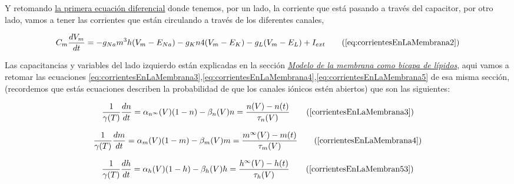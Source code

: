 Y retomando \hyperlink{LaEq}{la primera ecuación diferencial} donde tenemos, por un lado, la corriente que está pasando a través del capacitor, por otro lado, vamos a tener las corrientes que están circulando a través de los diferentes canales, 

\begin{equation}
  C_{m} \dfrac{dV_{m}}{dt} = - g_{Na} m^3 h(V_{m} - E_{Na}) - g_{K} n 4 (V_{m} - E_{K}) - g_{L} (V_{m} - E_{L}) + I_{ext}
  \tag{\ref{eq:corrientesEnLaMembrana2}}
\end{equation}

Las capacitancias y variables del lado izquierdo están explicadas en la sección \hyperlink{secc}{\emph{Modelo de la membrana como bicapa de lípidos}}, aqui vamos a retomar las ecuaciones \ref{eq:corrientesEnLaMembrana3},\ref{eq:corrientesEnLaMembrana4},\ref{eq:corrientesEnLaMembrana5} de esa misma sección, (recordemos que estás ecuaciones describen la probabilidad de que los canales iónicos estén abiertos) que son las siguientes:

\begin{equation}
  \dfrac{1}{\gamma(T)}\dfrac{dn}{dt} =  \alpha_{n^\infty} (V)(1 - n) - \beta_{n} (V) n = \dfrac{n(V)-n(t)}{\tau_{n}(V)}
  \tag{\ref{corrientesEnLaMembrana3}}
\end{equation}

\begin{equation}
  \dfrac{1}{\gamma(T)}\dfrac{dm}{dt} =  \alpha_{m} (V)(1 - m) - \beta_{m} (V) m = \dfrac{m^\infty(V)-m(t)}{\tau_{m}(V)}
  \tag{\ref{corrientesEnLaMembrana4}}
\end{equation}

\begin{equation}
  \dfrac{1}{\gamma(T)}\dfrac{dh}{dt} =  \alpha_{h} (V)(1 - h) - \beta_{h} (V) h = \dfrac{h^\infty(V)-h(t)}{\tau_{h}(V)}
  \tag{\ref{corrientesEnLaMembran53}}
\end{equation}

